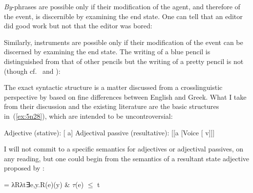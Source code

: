 \begin{exe}
\begin{xlist}
\begin{exe}
\begin{xlist}
\begin{exe}
\begin{exe}
\begin{xlist}
\begin{exe}
\begin{exe}
\begin{xlist}
\begin{exe}
\begin{xlist}
\begin{exe}
\begin{xlist}
\begin{exe}
\begin{xlist}
\begin{xlist}
\begin{exe}
\begin{xlist}
\begin{exe}
\begin{xlist}
\emph{By}-phrases are possible only if their modification of the agent, and therefore of the event, is discernible by examining the end state. One can tell that an editor did good work but not that the editor was bored:
 \begin{exe}
	
 \z 

Similarly, instruments are possible only if their modification of the event can be discerned by examining the end state. The writing of a blue pencil is distinguished from that of other pencils but the writing of a pretty pencil is not (though cf.~\citealt{mcintyre13} and \citealt{bruening14nllt}):
 \begin{exe}
	
 \z 

The exact syntactic structure is a matter discussed from a crosslinguistic perspective by \cite{alexiadouetal14,layering15} based on fine differences between English and Greek. What I take from their discussion and the existing literature are the basic structures in~(\ref{ex:5n28}), which are intended to be uncontroversial:
 \begin{exe}
 \ex  \label{ex:5n28}
 \begin{xlist} 
 	\ex  Adjective (stative): {[} a] 
 	\ex  Adjectival passive (resultative): {[}[a [Voice [ v]]] 
 \z
\z 

I will not commit to a specific semantics for adjectives or adjectival passives, on any reading, but one could begin from the semantics of a resultant state adjective proposed by \cite{kratzer00bls}:
 \begin{exe}
\ex  {} = λRλt∃e,y.R(e)(y) \& $\tau$(e) $\le$ t 
 \z 


\end{exe}
\end{xlist}
\end{exe}
\end{exe}
\end{exe}
\end{xlist}
\end{exe}
\end{xlist}
\end{exe}
\end{xlist}
\end{xlist}
\end{exe}
\end{xlist}
\end{exe}
\end{xlist}
\end{exe}
\end{xlist}
\end{exe}
\end{exe}
\end{xlist}
\end{exe}
\end{exe}
\end{xlist}
\end{exe}
\end{xlist}
\end{exe}
